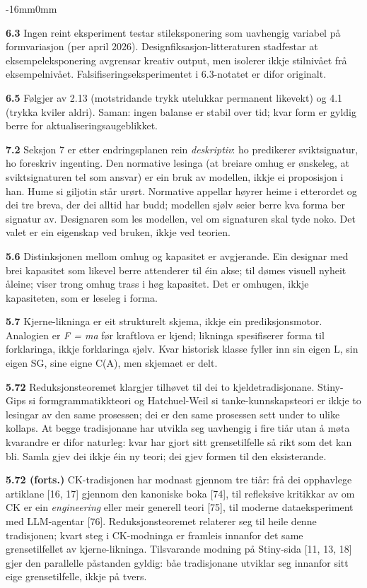 \documentclass[10pt,oneside]{book}
\newcommand{\msym}[1]{{\mathfbfont #1}}
\newenvironment{widebody}{%
  \begin{adjustwidth}{-16mm}{0mm}%
}{%
  \end{adjustwidth}%
}
\begin{document}
\begin{widebody}
{\textbf{6.3} Ingen reint eksperiment testar stileksponering som uavhengig variabel på formvariasjon (per april 2026). Designfiksasjon-litteraturen stadfestar at eksempeleksponering avgrensar kreativ output, men isolerer ikkje stilnivået frå eksempelnivået. Falsifiseringseksperimentet i 6.3-notatet er difor originalt.

\textbf{6.5} Følgjer av 2.13 (motstridande trykk utelukkar permanent likevekt) og 4.1 (trykka kviler aldri). Saman: ingen balanse er stabil over tid; kvar form er gyldig berre for aktualiseringsaugeblikket.

\textbf{7.2} Seksjon 7 er etter endringsplanen rein \textit{deskriptiv}: ho predikerer sviktsignatur, ho foreskriv ingenting. Den normative lesinga (at breiare omhug er ønskeleg, at sviktsignaturen tel som ansvar) er ein bruk av modellen, ikkje ei proposisjon i han. Hume si giljotin står urørt. Normative appellar høyrer heime i etterordet og dei tre breva, der dei alltid har budd; modellen sjølv seier berre kva forma ber signatur av. Designaren som les modellen, vel om signaturen skal tyde noko. Det valet er ein eigenskap ved bruken, ikkje ved teorien.

\textbf{5.6} Distinksjonen mellom omhug og kapasitet er avgjerande. Ein designar med brei kapasitet som likevel berre attenderer til éin akse; til dømes visuell nyheit åleine; viser trong omhug trass i høg kapasitet. Det er omhugen, ikkje kapasiteten, som er leseleg i forma.

\textbf{5.7} Kjerne-likninga er eit strukturelt skjema, ikkje ein prediksjonsmotor. Analogien er \textit{F = ma} før kraftlova er kjend; likninga spesifiserer forma til forklaringa, ikkje forklaringa sjølv. Kvar historisk klasse fyller inn sin eigen \msym{L}, sin eigen SG, sine eigne C(A), men skjemaet er delt.

\textbf{5.72} Reduksjonsteoremet klargjer tilhøvet til dei to kjeldetradisjonane. Stiny-Gips si formgrammatikkteori og Hatchuel-Weil si tanke-kunnskapsteori er ikkje to lesingar av den same prosessen; dei er den same prosessen sett under to ulike kollaps. At begge tradisjonane har utvikla seg uavhengig i fire tiår utan å møta kvarandre er difor naturleg: kvar har gjort sitt grensetilfelle så rikt som det kan bli. Samla gjev dei ikkje éin ny teori; dei gjev formen til den eksisterande.

\textbf{5.72 (forts.)} CK-tradisjonen har modnast gjennom tre tiår: frå dei opphavlege artiklane [16, 17] gjennom den kanoniske boka [74], til refleksive kritikkar av om CK er ein \textit{engineering} eller meir generell teori [75], til moderne dataeksperiment med LLM-agentar [76]. Reduksjonsteoremet relaterer seg til heile denne tradisjonen; kvart steg i CK-modninga er framleis innanfor det same grensetilfellet av kjerne-likninga. Tilsvarande modning på Stiny-sida [11, 13, 18] gjer den parallelle påstanden gyldig: båe tradisjonane utviklar seg innanfor sitt eige grensetilfelle, ikkje på tvers.

}
\end{widebody}
\end{document}
